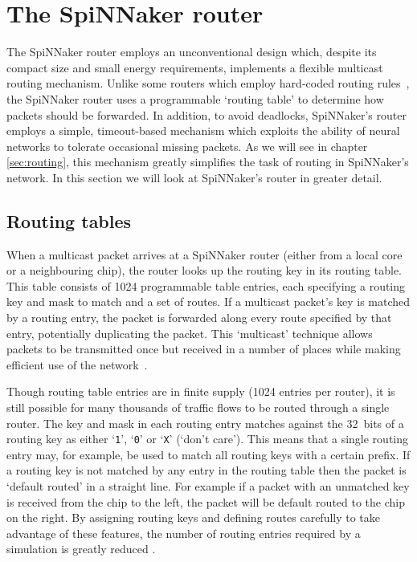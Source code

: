 	\section{The SpiNNaker router}
		
		The SpiNNaker router employs an unconventional design which, despite its
		compact size and small energy requirements, implements a flexible multicast
		routing mechanism. Unlike some routers which employ hard-coded routing
		rules~\cite[chapter~8]{dally04}, the SpiNNaker router uses a programmable
		`routing table' to determine how packets should be forwarded. In addition,
		to avoid deadlocks, SpiNNaker's router employs a simple, timeout-based
		mechanism which exploits the ability of neural networks to tolerate
		occasional missing packets. As we will see in chapter \ref{sec:routing},
		this mechanism greatly simplifies the task of routing in SpiNNaker's
		network. In this section we will look at SpiNNaker's router in greater
		detail.
		
		\subsection{Routing tables}
		
			When a multicast packet arrives at a SpiNNaker router (either from a
			local core or a neighbouring chip), the router looks up the routing key
			in its routing table. This table consists of \num{1024} programmable
			table entries, each specifying a routing key and mask to match and a set
			of routes.  If a multicast packet's key is matched by a routing entry,
			the packet is forwarded along every route specified by that entry,
			potentially duplicating the packet. This `multicast' technique allows
			packets to be transmitted once but received in a number of places while
			making efficient use of the network~\cite{navaridas12}.
			
			Though routing table entries are in finite supply (\num{1024} entries per
			router), it is still possible for many thousands of traffic flows to be
			routed through a single router. The key and mask in each routing entry
			matches against the 32~bits of a routing key as either `\texttt{1}',
			`\texttt{0}' or `\texttt{X}' (`don't care').  This means that a single
			routing entry may, for example, be used to match all routing keys with a
			certain prefix. If a routing key is not matched by any entry in the
			routing table then the packet is `default routed' in a straight line. For
			example if a packet with an unmatched key is received from the chip to
			the left, the packet will be default routed to the chip on the right. By
			assigning routing keys and defining routes carefully to take advantage of
			these features, the number of routing entries required by a simulation is
			greatly reduced \cite{davies12}.
			
